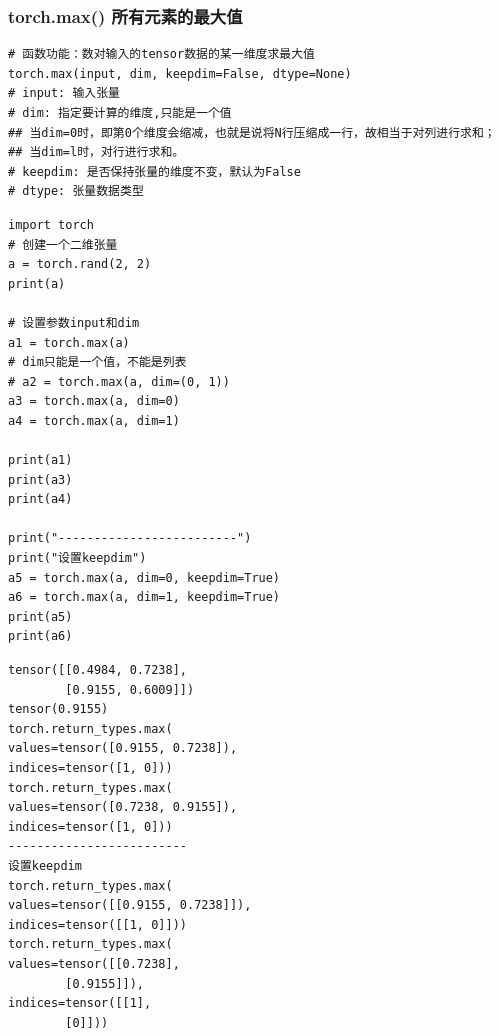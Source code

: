 \subsubsection{torch.max() 所有元素的最大值}
\begin{lstlisting}[style=demostyle,numbers=none]
# 函数功能：数对输入的tensor数据的某一维度求最大值
torch.max(input, dim, keepdim=False, dtype=None)
# input: 输入张量
# dim: 指定要计算的维度,只能是一个值
## 当dim=0时，即第0个维度会缩减，也就是说将N行压缩成一行，故相当于对列进行求和；
## 当dim=l时，对行进行求和。
# keepdim: 是否保持张量的维度不变，默认为False
# dtype: 张量数据类型
\end{lstlisting}
\begin{lstlisting}[style=pythonstyle]
import torch
# 创建一个二维张量
a = torch.rand(2, 2)
print(a)

# 设置参数input和dim
a1 = torch.max(a)
# dim只能是一个值，不能是列表
# a2 = torch.max(a, dim=(0, 1)) 
a3 = torch.max(a, dim=0)
a4 = torch.max(a, dim=1)

print(a1)
print(a3)
print(a4)

print("-------------------------")
print("设置keepdim")
a5 = torch.max(a, dim=0, keepdim=True)
a6 = torch.max(a, dim=1, keepdim=True)
print(a5)
print(a6)
\end{lstlisting}
\begin{lstlisting}[style=demostyle,numbers=none]
tensor([[0.4984, 0.7238],
        [0.9155, 0.6009]])
tensor(0.9155)
torch.return_types.max(
values=tensor([0.9155, 0.7238]),
indices=tensor([1, 0]))
torch.return_types.max(
values=tensor([0.7238, 0.9155]),
indices=tensor([1, 0]))
-------------------------
设置keepdim
torch.return_types.max(
values=tensor([[0.9155, 0.7238]]),
indices=tensor([[1, 0]]))
torch.return_types.max(
values=tensor([[0.7238],
        [0.9155]]),
indices=tensor([[1],
        [0]]))
\end{lstlisting}       

